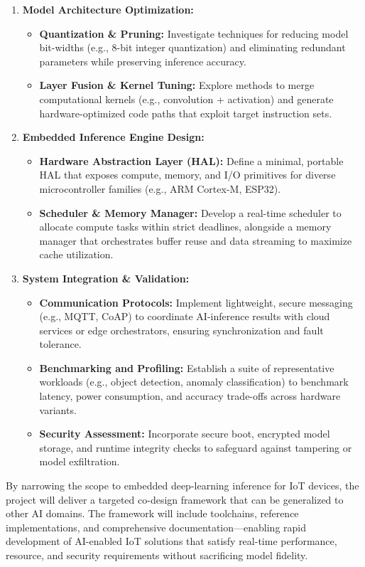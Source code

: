 \begin{enumerate}
    \item \textbf{Model Architecture Optimization:}
    \begin{itemize}
        \item \textbf{Quantization \& Pruning:} Investigate techniques for reducing model bit-widths (e.g., 8-bit integer quantization) and eliminating redundant parameters while preserving inference accuracy.
        \item \textbf{Layer Fusion \& Kernel Tuning:} Explore methods to merge computational kernels (e.g., convolution + activation) and generate hardware-optimized code paths that exploit target instruction sets.
    \end{itemize}
    
    \item \textbf{Embedded Inference Engine Design:}
    \begin{itemize}
        \item \textbf{Hardware Abstraction Layer (HAL):} Define a minimal, portable HAL that exposes compute, memory, and I/O primitives for diverse microcontroller families (e.g., ARM Cortex-M, ESP32).
        \item \textbf{Scheduler \& Memory Manager:} Develop a real-time scheduler to allocate compute tasks within strict deadlines, alongside a memory manager that orchestrates buffer reuse and data streaming to maximize cache utilization.
    \end{itemize}

    \item \textbf{System Integration \& Validation:}
    \begin{itemize}
        \item \textbf{Communication Protocols:} Implement lightweight, secure messaging (e.g., MQTT, CoAP) to coordinate AI-inference results with cloud services or edge orchestrators, ensuring synchronization and fault tolerance.
        \item \textbf{Benchmarking and Profiling:} Establish a suite of representative workloads (e.g., object detection, anomaly classification) to benchmark latency, power consumption, and accuracy trade-offs across hardware variants.
        \item \textbf{Security Assessment:} Incorporate secure boot, encrypted model storage, and runtime integrity checks to safeguard against tampering or model exfiltration.
    \end{itemize}
\end{enumerate}

\noindent
By narrowing the scope to embedded deep-learning inference for IoT devices, the project will deliver a targeted co-design framework that can be generalized to other AI domains. The framework will include toolchains, reference implementations, and comprehensive documentation—enabling rapid development of AI-enabled IoT solutions that satisfy real-time performance, resource, and security requirements without sacrificing model fidelity.
